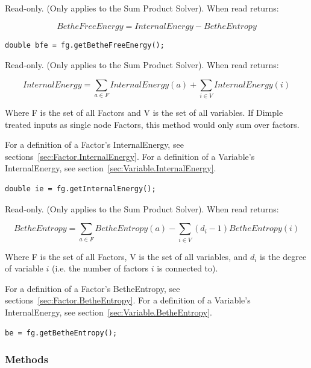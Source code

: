 Read-only.  (Only applies to the Sum Product Solver).  When read returns:

\[
BetheFreeEnergy = InternalEnergy - BetheEntropy
\]

\ifjava
\begin{lstlisting}
double bfe = fg.getBetheFreeEnergy();
\end{lstlisting}
\fi

\label{sec:FactorGraph.InternalEnergy}

Read-only.  (Only applies to the Sum Product Solver).  When read returns:

\[
InternalEnergy = \sum_{a \in F }InternalEnergy(a) + \sum_{i \in V}InternalEnergy(i)
\]

Where F is the set of all Factors and V is the set of all variables.  If Dimple treated inputs as single node Factors, this method would only sum over factors.

For a definition of a Factor's InternalEnergy, see sections~\ref{sec:Factor.InternalEnergy}.  For a definition of a Variable's InternalEnergy, see section~\ref{sec:Variable.InternalEnergy}.

\ifjava
\begin{lstlisting}
double ie = fg.getInternalEnergy();
\end{lstlisting}
\fi

\label{sec:FactorGraph.BetheEntropy}

Read-only.  (Only applies to the Sum Product Solver).  When read returns:

\[
 BetheEntropy = \sum_{a \in F}BetheEntropy(a) - \sum_{i \in V}(d_i-1) BetheEntropy(i) 
 \]

Where F is the set of all Factors, V is the set of all variables, and $d_i$ is the degree of variable $i$ (i.e. the number of factors $i$ is connected to).

For a definition of a Factor's BetheEntropy, see sections~\ref{sec:Factor.BetheEntropy}.  For a definition of a Variable's InternalEnergy, see section~\ref{sec:Variable.BetheEntropy}.

\ifjava
\begin{lstlisting}
be = fg.getBetheEntropy();
\end{lstlisting}
\fi


\subsubsection{Methods}

\label{sec:FactorGraph.addFactor}


